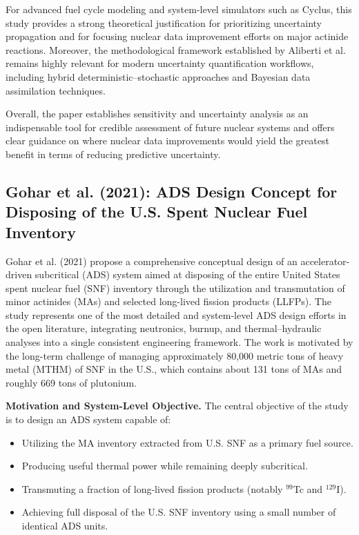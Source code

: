 For advanced fuel cycle modeling and system-level simulators such as Cyclus, this study provides a strong theoretical 
justification for prioritizing uncertainty propagation and for focusing nuclear data improvement efforts on major actinide 
reactions. Moreover, the methodological framework established by Aliberti et al. remains highly relevant for modern uncertainty 
quantification workflows, including hybrid deterministic–stochastic approaches and Bayesian data assimilation techniques.

Overall, the paper establishes sensitivity and uncertainty analysis as an indispensable tool for credible assessment of 
future nuclear systems and offers clear guidance on where nuclear data improvements would yield the greatest benefit in terms of 
reducing predictive uncertainty.
\subsection{Gohar et al. (2021): ADS Design Concept for Disposing of the U.S. Spent Nuclear Fuel Inventory}
\label{subsec:gohar2021}

Gohar et al. (2021) propose a comprehensive conceptual design of an accelerator-driven subcritical (ADS) system aimed at 
disposing of the entire United States spent nuclear fuel (SNF) inventory through the utilization and transmutation of minor 
actinides (MAs) and selected long-lived fission products (LLFPs). The study represents one of the most detailed and system-level 
ADS design efforts in the open literature, integrating neutronics, burnup, and thermal--hydraulic analyses into a single consistent 
engineering framework. The work is motivated by the long-term challenge of managing approximately 80,000 metric tons of heavy metal 
(MTHM) of SNF in the U.S., which contains about 131 tons of MAs and roughly 669 tons of plutonium.

\textbf{Motivation and System-Level Objective.}  
The central objective of the study is to design an ADS system capable of:
\begin{itemize}
    \item Utilizing the MA inventory extracted from U.S. SNF as a primary fuel source.
    \item Producing useful thermal power while remaining deeply subcritical.
    \item Transmuting a fraction of long-lived fission products (notably $^{99}$Tc and $^{129}$I).
    \item Achieving full disposal of the U.S. SNF inventory using a small number of identical ADS units.
\end{itemize}

